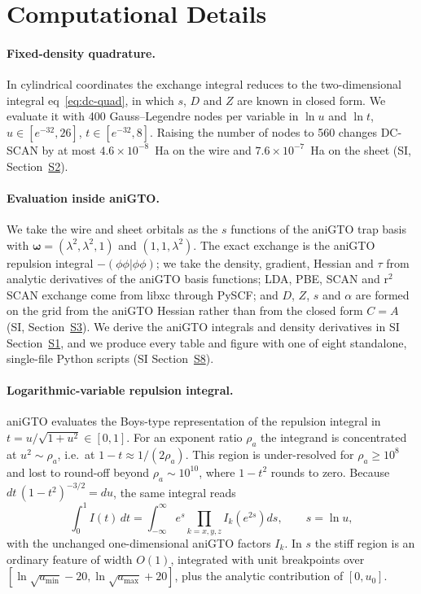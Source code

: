 \documentclass[journal=jctcce,manuscript=article]{achemso}
\begin{document}
\section{Computational Details}
\label{sec:methods}
\paragraph{Fixed-density quadrature.}
In cylindrical coordinates the exchange integral reduces to the
two-dimensional integral eq~\ref{eq:dc-quad}, in which $s$, $D$ and $Z$ are
known in closed form.  We evaluate it with 400 Gauss--Legendre nodes per
variable in $\ln u$ and $\ln t$, $u\in[e^{-32},26]$, $t\in[e^{-32},8]$.
Raising the number of nodes to 560 changes DC-SCAN by at most
$4.6\times10^{-8}$~Ha on the wire and $7.6\times10^{-7}$~Ha on the sheet (SI,
Section~\href{si.pdf\#section.2}{S2}).

\paragraph{Evaluation inside aniGTO.}
We take the wire and sheet orbitals as the $s$ functions of the aniGTO trap
basis with $\boldsymbol\omega=(\lambda^2,\lambda^2,1)$ and $(1,1,\lambda^2)$.
The exact exchange is the aniGTO repulsion integral $-(\phi\phi|\phi\phi)$; we
take the density, gradient, Hessian and $\tau$ from analytic derivatives of
the aniGTO basis functions; LDA, PBE, SCAN and r$^2$SCAN exchange come from
libxc through PySCF; and $D$, $Z$, $s$ and $\alpha$ are formed on the grid
from the aniGTO Hessian rather than from the closed form $C=A$ (SI,
Section~\href{si.pdf\#section.3}{S3}).  We derive the aniGTO integrals and density
derivatives in SI Section~\href{si.pdf\#section.1}{S1}, and we produce every
table and figure with one of eight standalone, single-file Python scripts (SI
Section~\href{si.pdf\#section.8}{S8}).

\paragraph{Logarithmic-variable repulsion integral.}
aniGTO evaluates the Boys-type representation of the repulsion integral in
$t=u/\sqrt{1+u^2}\in[0,1]$.  For an exponent ratio $\rho_a$ the integrand is
concentrated at $u^2\sim\rho_a$, i.e.\ at $1-t\approx1/(2\rho_a)$.  This
region is under-resolved for $\rho_a\ge10^8$ and lost to round-off beyond
$\rho_a\sim10^{10}$, where $1-t^2$ rounds to zero.  Because
$dt\,(1-t^2)^{-3/2}=du$, the same integral reads
\begin{equation}
\int_0^1 I(t)\,dt=\int_{-\infty}^{\infty}e^{s}\prod_{k=x,y,z}I_k\!\left(e^{2s}\right)ds,
\qquad s=\ln u,
\label{eq:logvar-eri}
\end{equation}
with the unchanged one-dimensional aniGTO factors $I_k$.  In $s$ the stiff
region is an ordinary feature of width $O(1)$, integrated with unit
breakpoints over $[\ln\sqrt{a_{\min}}-20,\ln\sqrt{a_{\max}}+20]$, plus the
analytic contribution of $[0,u_0]$.
\end{document}
